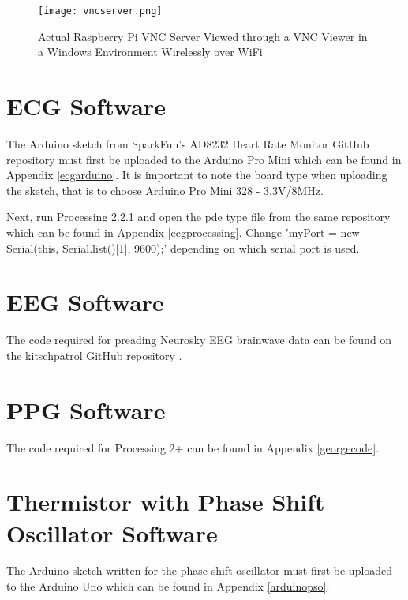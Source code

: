 \begin{figure}[H]
	\centering
	\texttt{[image: vncserver.png]}
	\caption{Actual Raspberry Pi VNC Server Viewed through a VNC Viewer in a Windows Environment Wirelessly over WiFi}
	\label{vncserver}
\end{figure} 

\section{ECG Software}

The Arduino sketch from SparkFun's AD8232 Heart Rate Monitor GitHub repository must first be uploaded to the Arduino Pro Mini \cite{ad8232github} which can be found in Appendix \ref{ecgarduino}. It is important to note the board type when uploading the sketch, that is to choose Arduino Pro Mini 328 - 3.3V/8MHz. 

Next, run Processing 2.2.1 and open the pde type file from the same repository \cite{ad8232github} which can be found in Appendix \ref{ecgprocessing}. Change 'myPort = new Serial(this, Serial.list()[1], 9600);' depending on which serial port is used. 

\section{EEG Software}

The code required for preading Neurosky EEG brainwave data can be found on the kitschpatrol GitHub repository \cite{jiahui14}.

\section{PPG Software}

The code required for Processing 2+ can be found in Appendix \ref{georgecode}.

\section{Thermistor with Phase Shift Oscillator Software}

The Arduino sketch written for the phase shift oscillator must first be uploaded to the Arduino Uno which can be found in Appendix \ref{arduinopso}.


